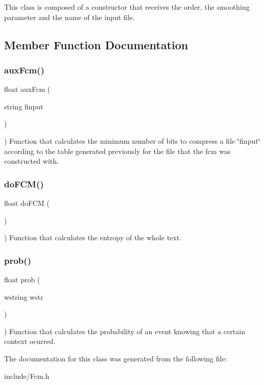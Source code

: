 This class is composed of a constructor that receives the order, the smoothing parameter and the name of the input file. 

\subsection{Member Function Documentation}
\mbox{\label{classFcm_a46ff33d5782a0ff3e041106977917ef2}} 
\subsubsection{\texorpdfstring{aux\+Fcm()}{auxFcm()}}
{\footnotesize\ttfamily float aux\+Fcm (\begin{DoxyParamCaption}\item[{string}]{finput }\end{DoxyParamCaption})\hspace{0.3cm}{\ttfamily [inline]}}

) Function that calculates the minimum number of bits to compress a file \char`\"{}finput\char`\"{} according to the table generated previously for the file that the fcm was constructed with.\mbox{\label{classFcm_a0efbdb9b781da543be2a9a86b73b528d}} 
\subsubsection{\texorpdfstring{do\+F\+C\+M()}{doFCM()}}
{\footnotesize\ttfamily float do\+F\+CM (\begin{DoxyParamCaption}{ }\end{DoxyParamCaption})\hspace{0.3cm}{\ttfamily [inline]}}

) Function that calculates the entropy of the whole text.\mbox{\label{classFcm_a4c5faff6ef8a999d3bb497e2ee9564ec}} 
\subsubsection{\texorpdfstring{prob()}{prob()}}
{\footnotesize\ttfamily float prob (\begin{DoxyParamCaption}\item[{wstring}]{wstr }\end{DoxyParamCaption})\hspace{0.3cm}{\ttfamily [inline]}}

) Function that calculates the probability of an event knowing that a certain context ocurred.

The documentation for this class was generated from the following file\+:\begin{DoxyCompactItemize}
\item 
include/Fcm.\+h\end{DoxyCompactItemize}
